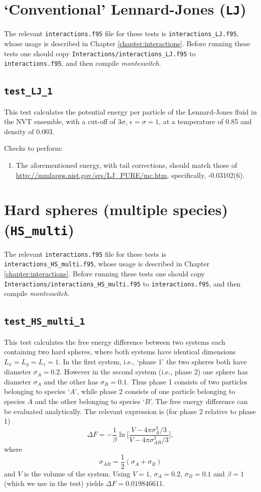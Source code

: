 \documentclass{report}
\begin{document}
\section{`Conventional' Lennard-Jones (\texttt{LJ})}
The relevant \texttt{interactions.f95} file for these tests is \texttt{interactions\_LJ.f95}, whose usage is described in Chapter
\ref{chapter:interactions}. Before running these tests one should copy \texttt{Interactions/interactions\_LJ.f95}
to \texttt{interactions.f95}, and then compile \emph{monteswitch}.


\subsection{\texttt{test\_LJ\_1}}
This test calculates the potential energy per particle of the Lennard-Jones fluid in the NVT ensemble, with a cut-off of
$3\sigma$, $\epsilon=\sigma=1$, at a temperature of 0.85 and density of 0.003.

Checks to perform:
\begin{enumerate}
\item
The aforementioned energy, with tail corrections, should match those of \url{http://mmlapps.nist.gov/srs/LJ_PURE/mc.htm},
specifically, -0.03102(6).
\end{enumerate}


\section{Hard spheres (multiple species) (\texttt{HS\_multi})}
The relevant \texttt{interactions.f95} file for these tests is \texttt{interactions\_HS\_multi.f95}, whose usage is described in Chapter
\ref{chapter:interactions}. Before running these tests one should copy \texttt{Interactions/interactions\_HS\_multi.f95}
to \texttt{interactions.f95}, and then compile \emph{monteswitch}.

\subsection{\texttt{test\_HS\_multi\_1}}
This test calculates the free energy difference between two systems each containing two hard spheres, where both systems have identical dimensions
$L_x=L_y=L_z=1$. In the first system, i.e., `phase 1' the two spheres both have diameter $\sigma_A=0.2$. However in the second system (i.e., phase 2) 
one sphere has diameter $\sigma_A$ and the other has $\sigma_B=0.1$. Thus phase 1 consists of two particles belonging to species `$A$', while phase 2
consists of one particle belonging to species $A$ and the other belonging to species `$B$'.
The free energy difference can be evaluated analytically. The relevant expression is (for phase 2 relative to phase 1)
\begin{equation}
\Delta F=-\frac{1}{\beta}\ln\Biggl[\frac{V-4\pi\sigma_A^3/3}{V-4\pi\sigma_{AB}^3/3}\Biggr],
\end{equation}
where
\begin{equation}
\sigma_{AB}=\frac{1}{2}(\sigma_A+\sigma_B)
\end{equation}
and $V$ is the volume of the system. Using $V=1$, $\sigma_A=0.2$, $\sigma_B=0.1$ and $\beta=1$ (which we use in the test) yields 
$\Delta F=0.019846611$. 
\end{document}
